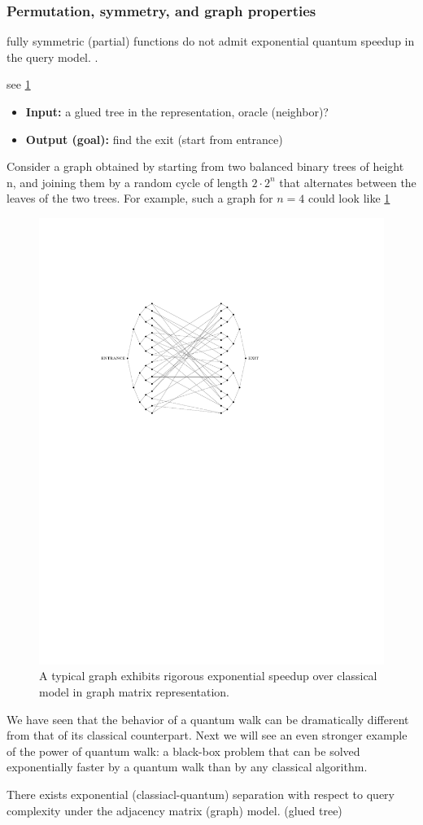 \subsubsection{Permutation, symmetry, and graph properties}
fully symmetric (partial) functions do not admit exponential quantum speedup in the query model.
\cite{ben-davidSymmetriesGraphProperties2020}.
\begin{problem}
	see \cref{fig:glued_tree}
	\begin{itemize}
		\item \textbf{Input:} a glued tree in the  representation, oracle (neighbor)?
		\item \textbf{Output (goal):} find the exit (start from entrance)
	\end{itemize}
\end{problem}
Consider a graph obtained by starting from two balanced binary trees of height n, and joining them by a random cycle of length $2\cdot 2^n$ that alternates between the leaves of the two trees. 
For example, such a graph for $n = 4$ could look like \cref{fig:glued_tree}
\begin{figure}[!ht]
	\centering
	\includegraphics[width=.5\linewidth]{glued_tree.pdf}
	\caption{A typical graph exhibits rigorous exponential speedup over classical model in graph matrix representation. \cite{childsExponentialAlgorithmicSpeedup2003}}
	\label{fig:glued_tree}
\end{figure}
We have seen that the behavior of a quantum walk can be dramatically different from that of its classical counterpart. Next we will see an even stronger example of the power of quantum walk: a black-box problem that can be solved exponentially faster by a quantum walk than by any classical algorithm.
\begin{theorem}
	There exists exponential (classiacl-quantum) separation with respect to query complexity under the adjacency matrix (graph) model. (glued tree)
\end{theorem}


